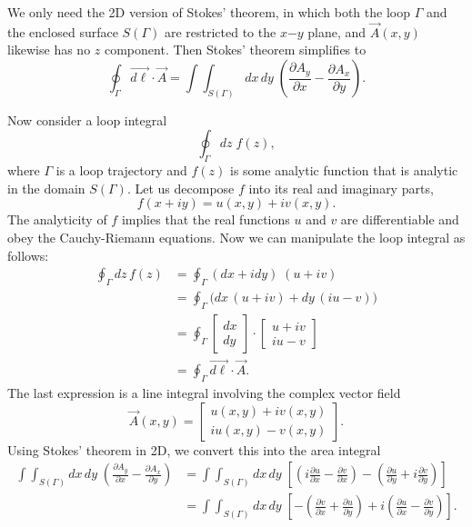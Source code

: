 \documentclass[10pt,a4paper]{article}
\begin{document}
We only need the 2D version of Stokes' theorem, in which both the loop
$\Gamma$ and the enclosed surface $S(\Gamma)$ are restricted to the
$x\mathrm{-}y$ plane, and $\vec{A}(x,y)$ likewise has no $z$
component. Then Stokes' theorem simplifies to
\begin{equation}
\oint_\Gamma \vec{d\ell} \cdot \vec{A} = \int\!\!\!\int_{S(\Gamma)}\! dx \,dy \; \left(\frac{\partial A_y}{\partial x} - \frac{\partial A_x}{\partial y}\right).
\end{equation}

Now consider a loop integral
\begin{equation}
\oint_\Gamma dz \; f(z),
\end{equation}
where $\Gamma$ is a loop trajectory and $f(z)$ is some analytic
function that is analytic in the domain $S(\Gamma)$. Let us decompose
$f$ into its real and imaginary parts,
\begin{equation}
f(x+iy) = u(x,y) + iv(x,y).
\end{equation}
The analyticity of $f$ implies that the real functions $u$ and $v$ are
differentiable and obey the Cauchy-Riemann equations. Now we can
manipulate the loop integral as follows:
\begin{align}
  \oint_\Gamma dz \, f(z) &= \oint_\Gamma \left(dx + i dy\right) \; \left(u + i v\right) \\
  &= \oint_\Gamma \Bigg(dx\, (u+iv) + dy\, (iu - v) \Bigg)  \\
  &= \oint_\Gamma \begin{bmatrix}dx\\dy\end{bmatrix} \cdot \begin{bmatrix}u + i v \\ iu - v\end{bmatrix} \\
      &= \oint_\Gamma \vec{d\ell} \cdot \vec{A}.
\end{align}
The last expression is a line integral involving the complex vector
field
\begin{equation}
  \vec{A}(x,y) = \begin{bmatrix}u(x,y) + i v(x,y) \\
    iu(x,y) - v(x,y)\end{bmatrix}.
\end{equation}
Using Stokes' theorem in 2D, we convert this into the area integral
\begin{align}
  \int\!\!\!\int_{S(\Gamma)} dx \,dy \; \left(\frac{\partial A_y}{\partial x} - \frac{\partial A_x}{\partial y}\right) &= \int\!\!\!\int_{S(\Gamma)} dx \,dy \; \left[\left(i\frac{\partial u}{\partial x} - \frac{\partial v}{\partial x}\right) - \left(\frac{\partial u}{\partial y} + i \frac{\partial v}{\partial y}\right)\right] \\
  &= \int\!\!\!\int_{S(\Gamma)} dx \,dy \; \left[- \left(\frac{\partial v}{\partial x} + \frac{\partial u}{\partial y} \right) + i\left(\frac{\partial u}{\partial x} - \frac{\partial v}{\partial y}\right)\right].
\end{align}
\end{document}
